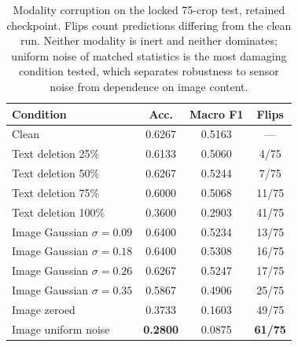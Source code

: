 
\begin{table}[t]
\caption{Modality corruption on the locked 75-crop test, retained checkpoint. Flips count predictions differing from the clean run. Neither modality is inert and neither dominates; uniform noise of matched statistics is the most damaging condition tested, which separates robustness to sensor noise from dependence on image content.}
\label{tab:corruption}
\centering\footnotesize
\setlength\tabcolsep{4pt}
\begin{tabular}{lccc}
\toprule
\textbf{Condition} & \textbf{Acc.} & \textbf{Macro F1} & \textbf{Flips}\\
\midrule
Clean & 0.6267 & 0.5163 & ---\\
\midrule
Text deletion 25\% & 0.6133 & 0.5060 & 4/75\\
Text deletion 50\% & 0.6267 & 0.5244 & 7/75\\
Text deletion 75\% & 0.6000 & 0.5068 & 11/75\\
Text deletion 100\% & 0.3600 & 0.2903 & 41/75\\
\midrule
Image Gaussian $\sigma{=}0.09$ & 0.6400 & 0.5234 & 13/75\\
Image Gaussian $\sigma{=}0.18$ & 0.6400 & 0.5308 & 16/75\\
Image Gaussian $\sigma{=}0.26$ & 0.6267 & 0.5247 & 17/75\\
Image Gaussian $\sigma{=}0.35$ & 0.5867 & 0.4906 & 25/75\\
\midrule
Image zeroed & 0.3733 & 0.1603 & 49/75\\
Image uniform noise & \textbf{0.2800} & 0.0875 & \textbf{61/75}\\
\bottomrule
\end{tabular}
\end{table}
